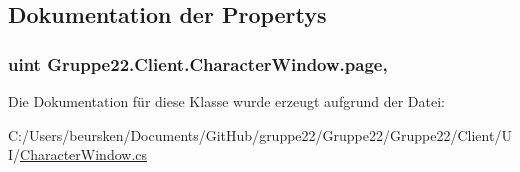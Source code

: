 \subsection{Dokumentation der Propertys}
\hypertarget{class_gruppe22_1_1_client_1_1_character_window_ac8d2bb9506d4bd08d868670e934538b6}{
\subsubsection[{page}]{\setlength{\rightskip}{0pt plus 5cm}uint Gruppe22.\-Client.\-Character\-Window.\-page\hspace{0.3cm}{\ttfamily [get]}, {\ttfamily [set]}}}\label{class_gruppe22_1_1_client_1_1_character_window_ac8d2bb9506d4bd08d868670e934538b6}


Die Dokumentation für diese Klasse wurde erzeugt aufgrund der Datei\-:\begin{DoxyCompactItemize}
\item 
C\-:/\-Users/beursken/\-Documents/\-Git\-Hub/gruppe22/\-Gruppe22/\-Gruppe22/\-Client/\-U\-I/\hyperlink{_character_window_8cs}{Character\-Window.\-cs}\end{DoxyCompactItemize}
